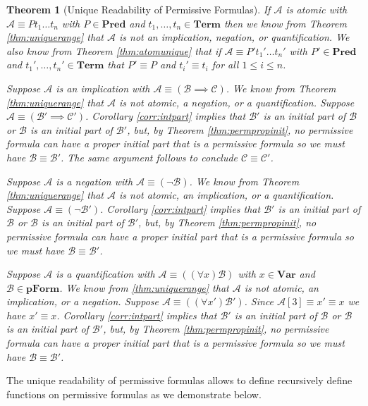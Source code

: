 \documentclass[12pt]{article}
\theoremstyle{break}
\theoremstyle{break}
\newtheorem{theorem}{Theorem}[section]
\theoremstyle{break}
\theoremstyle{break}
\newcommand{\mc}[1]{\mathcal{#1}}
\begin{document}
\begin{theorem}[Unique Readability of Permissive Formulas]
\label{thm:uniqueread}
If $\mc{A}$ is atomic with $\mc{A}\equiv Pt_1\ldots t_n$ with $P\in \textbf{Pred}$ and $t_1, \ldots, t_n \in \textbf{Term}$ then we know from Theorem \ref{thm:uniquerange} that $\mc{A}$ is not an implication, negation, or quantification.
We also know from Theorem \ref{thm:atomunique} that if $\mc{A} \equiv P't_1'\ldots t_n'$ with $P'\in\textbf{Pred}$ and $t_1',\ldots, t_n'\in\textbf{Term}$ that $P' \equiv P$ and $t_i' \equiv t_i$ for all $1 \le i \le n$.

Suppose $\mc{A}$ is an implication with $\mc{A} \equiv (\mc{B} \implies \mc{C})$.
We know from Theorem \ref{thm:uniquerange} that $\mc{A}$ is not atomic, a negation, or a quantification.
Suppose $\mc{A} \equiv (\mc{B}'\implies \mc{C}')$.
Corollary \ref{corr:intpart} implies that $\mc{B}'$ is an initial part of $\mc{B}$ or $\mc{B}$ is an initial part of $\mc{B}'$, but, by Theorem \ref{thm:permpropinit}, no permissive formula can have a proper initial part that is a permissive formula so we must have $\mc{B} \equiv \mc{B}'$. 
The same argument follows to conclude $\mc{C} \equiv \mc{C}'$.

Suppose $\mc{A}$ is a negation with $\mc{A} \equiv (\lnot \mc{B})$.
We know from Theorem \ref{thm:uniquerange} that $\mc{A}$ is not atomic, an implication, or a quantification.
Suppose $\mc{A} \equiv (\lnot \mc{B}')$.
Corollary \ref{corr:intpart} implies that $\mc{B}'$ is an initial part of $\mc{B}$ or $\mc{B}$ is an initial part of $\mc{B}'$, but, by Theorem \ref{thm:permpropinit}, no permissive formula can have a proper initial part that is a permissive formula so we must have $\mc{B} \equiv \mc{B}'$. 

Suppose $\mc{A}$ is a quantification with $\mc{A} \equiv ((\forall x) \mc{B})$ with $x \in \textbf{Var}$ and $\mc{B}\in\textbf{pForm}$.
We know from \ref{thm:uniquerange} that $\mc{A}$ is not atomic, an implication, or a negation.
Suppose $\mc{A} \equiv ((\forall x') \mc{B}')$.
Since $\mc{A}[3] \equiv x' \equiv x$ we have $x' \equiv x$.
Corollary \ref{corr:intpart} implies that $\mc{B}'$ is an initial part of $\mc{B}$ or $\mc{B}$ is an initial part of $\mc{B}'$, but, by Theorem \ref{thm:permpropinit}, no permissive formula can have a proper initial part that is a permissive formula so we must have $\mc{B} \equiv \mc{B}'$. 
\end{theorem}

The unique readability of permissive formulas allows to define recursively define functions on permissive formulas as we demonstrate below.
\end{document}
